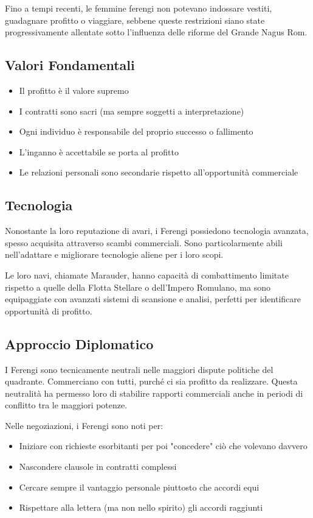 \documentclass[letterpaper,twocolumn,openany,nodeprecatedcode]{dndbook}
\begin{document}
Fino a tempi recenti, le femmine ferengi non potevano indossare vestiti, guadagnare profitto o viaggiare, sebbene queste restrizioni siano state progressivamente allentate sotto l'influenza delle riforme del Grande Nagus Rom.

\subsection{Valori Fondamentali}
\begin{itemize}
    \item Il profitto è il valore supremo
    \item I contratti sono sacri (ma sempre soggetti a interpretazione)
    \item Ogni individuo è responsabile del proprio successo o fallimento
    \item L'inganno è accettabile se porta al profitto
    \item Le relazioni personali sono secondarie rispetto all'opportunità commerciale
\end{itemize}

\subsection{Tecnologia}
Nonostante la loro reputazione di avari, i Ferengi possiedono tecnologia avanzata, spesso acquisita attraverso scambi commerciali. Sono particolarmente abili nell'adattare e migliorare tecnologie aliene per i loro scopi.

Le loro navi, chiamate Marauder, hanno capacità di combattimento limitate rispetto a quelle della Flotta Stellare o dell'Impero Romulano, ma sono equipaggiate con avanzati sistemi di scansione e analisi, perfetti per identificare opportunità di profitto.

\subsection{Approccio Diplomatico}
I Ferengi sono tecnicamente neutrali nelle maggiori dispute politiche del quadrante. Commerciano con tutti, purché ci sia profitto da realizzare. Questa neutralità ha permesso loro di stabilire rapporti commerciali anche in periodi di conflitto tra le maggiori potenze.

Nelle negoziazioni, i Ferengi sono noti per:
\begin{itemize}
    \item Iniziare con richieste esorbitanti per poi "concedere" ciò che volevano davvero
    \item Nascondere clausole in contratti complessi
    \item Cercare sempre il vantaggio personale piuttosto che accordi equi
    \item Rispettare alla lettera (ma non nello spirito) gli accordi raggiunti
\end{itemize}
\end{document}
